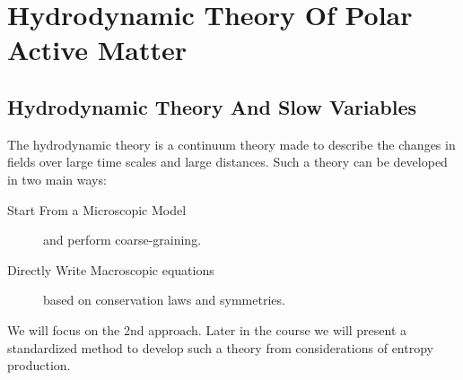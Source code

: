 \section{Hydrodynamic Theory Of Polar Active Matter}
\subsection{Hydrodynamic Theory And Slow Variables}
The hydrodynamic theory is a continuum theory made to describe the changes in fields over large time scales and large distances. Such a theory can be developed in two main ways:
\begin{description}
	\item[Start From a Microscopic Model] and perform coarse-graining.
	\item[Directly Write Macroscopic equations] based on conservation laws and symmetries. 
\end{description}
We will focus on the 2nd approach. Later in the course we will present a standardized method to develop such a theory from considerations of entropy production.
